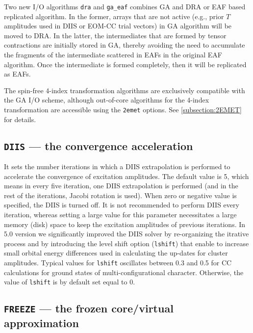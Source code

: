Two new I/O algorithms \verb+dra+ and \verb+ga_eaf+ combines GA and DRA or EAF based replicated 
algorithm.  In the former, arrays that are not active (e.g., prior $T$ amplitudes used in DIIS
or EOM-CC trial vectors) in GA algorithm will be moved to DRA.  In the latter, the intermediates
that are formed by tensor contractions are initially stored in GA, thereby avoiding the need to
accumulate the fragments of the intermediate scattered in EAFs in the original EAF algorithm.
Once the intermediate is formed completely, then it will be replicated as EAFs.

The spin-free 4-index transformation algorithms are exclusively compatible with the GA I/O scheme,
although out-of-core algorithms for the 4-index transformation are accessible using the
\verb+2emet+ options.  See \ref{subsection:2EMET} for details.

\subsection{{\tt DIIS} --- the convergence acceleration}

It sets the number iterations in which a DIIS extrapolation is performed to accelerate
the convergence of excitation amplitudes.  The default value is 5, which means in every
five iteration, one DIIS extrapolation is performed (and in the rest of the iterations,
Jacobi rotation is used).  When zero or negative value is specified, the DIIS is turned
off.  It is not recommended to perform DIIS every iteration, whereas setting a large 
value for this parameter necessitates a large memory (disk) space to keep the excitation
amplitudes of previous iterations. In 5.0 version we significantly improved the DIIS solver
by re-organizing the itrative process and by introducing the level shift option 
({\tt lshift}) that enable to increase small orbital energy differences used in 
calculating the up-dates for cluster amplitudes. 
Typical values for {\tt lshift} oscillates between 0.3 and 0.5 for CC calculations for 
ground states of multi-configurational character.
Otherwise, the value of {\tt lshift} is by default set equal to 0.


\subsection{{\tt FREEZE} --- the frozen core/virtual approximation}

